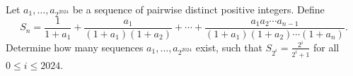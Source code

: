 Let $a_1,\dots,a_{2^{2024}}$ be a sequence of pairwise distinct positive integers.
Define
$$S_n = \frac{1}{1+a_1}+\frac{a_1}{(1+a_1)(1+a_2)}+\cdots
+\frac{a_1a_2\cdots a_{n-1}}{(1+a_1)(1+a_2)\cdots(1+a_n)}.$$
Determine how many sequences $a_1,\dots,a_{2^{2024}}$ exist,
such that $S_{2^i} =\frac{2^i}{2^i+1}$ for all $0\leq i\leq 2024$.
